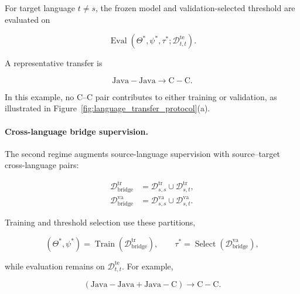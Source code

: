 \documentclass[authoryear,final,5p,times,twocolumn]{elsarticle}
\theoremstyle{plain}
\begin{document}
For target language $t\neq s$, the frozen model and validation-selected
threshold are evaluated on

\begin{equation}
\label{eq:target_language_evaluation}
\operatorname{Eval}
\left(
    \Theta^{*},
    \psi^{*},
    \tau^{*};
    \mathcal{D}_{t,t}^{\mathrm{te}}
\right).
\end{equation}

A representative transfer is

\begin{equation}
\label{eq:java_to_c}
\mathrm{Java}\!-\!\mathrm{Java}
\longrightarrow
\mathrm{C}\!-\!\mathrm{C}.
\end{equation}

In this example, no C--C pair contributes to either training or validation,
as illustrated in Figure~\ref{fig:language_transfer_protocol}(a).

\paragraph{Cross-language bridge supervision.}
The second regime augments source-language supervision with source--target
cross-language pairs:

\begin{align}
\label{eq:bridge_supervision}
\mathcal{D}_{\mathrm{bridge}}^{\mathrm{tr}}
&=
\mathcal{D}_{s,s}^{\mathrm{tr}}
\cup
\mathcal{D}_{s,t}^{\mathrm{tr}},
\\
\mathcal{D}_{\mathrm{bridge}}^{\mathrm{va}}
&=
\mathcal{D}_{s,s}^{\mathrm{va}}
\cup
\mathcal{D}_{s,t}^{\mathrm{va}}.
\end{align}

Training and threshold selection use these partitions,

\begin{equation}
(\Theta^{*},\psi^{*})
=
\operatorname{Train}
\left(
    \mathcal{D}_{\mathrm{bridge}}^{\mathrm{tr}}
\right),
\qquad
\tau^{*}
=
\operatorname{Select}
\left(
    \mathcal{D}_{\mathrm{bridge}}^{\mathrm{va}}
\right),
\end{equation}

while evaluation remains on $\mathcal{D}_{t,t}^{\mathrm{te}}$. For example,

\begin{equation}
\label{eq:bridge_example}
\left(
    \mathrm{Java}\!-\!\mathrm{Java}
    +
    \mathrm{Java}\!-\!\mathrm{C}
\right)
\longrightarrow
\mathrm{C}\!-\!\mathrm{C}.
\end{equation}
\end{document}
